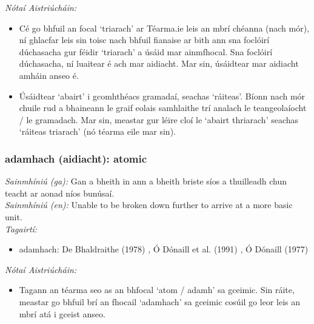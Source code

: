  \noindent \textit{Nótaí Aistriúcháin:}
\begin{itemize}
	\item Cé go bhfuil an focal `triarach' ar Téarma.ie leis an mbrí chéanna (nach mór), ní ghlacfar leis sin toisc nach bhfuil fianaise ar bith ann sna foclóirí dúchasacha gur féidir `triarach' a úsáid mar ainmfhocal. Sna foclóirí dúchasacha, ní luaitear é ach mar aidiacht. Mar sin, úsáidtear mar aidiacht amháin anseo é.
	\item Úsáidtear `abairt' i gcomhthéacs gramadaí, seachas `ráiteas'. Bíonn nach mór chuile rud a bhaineann le graif eolais samhlaithe trí analach le teangeolaíocht / le gramadach. Mar sin, meastar gur léire cloí le `abairt thriarach' seachas `ráiteas triarach' (nó téarma eile mar sin).
\end{itemize}


\subsubsection*{adamhach (aidiacht): atomic}
 \noindent \textit{Sainmhíniú (ga):} Gan a bheith in ann a bheith briste síos a thuilleadh chun teacht ar aonad níos bunúsaí.
\\
 \noindent \textit{Sainmhíniú (en):} Unable to be broken down further to arrive at a more basic unit.
\\
 \noindent \textit{Tagairtí:}
\begin{itemize}
	\item adamhach: De Bhaldraithe (1978) \cite{de-bhaldraithe}, Ó Dónaill et al. (1991) \cite{focloir-beag}, Ó Dónaill (1977) \cite{odonaill}
\end{itemize}

 \noindent \textit{Nótaí Aistriúcháin:}
\begin{itemize}
	\item Tagann an téarma seo as an bhfocal `atom / adamh' sa gceimic. Sin ráite, meastar go bhfuil brí an fhocail `adamhach' sa gceimic cosúil go leor leis an mbrí atá i gceist anseo.
\end{itemize}


